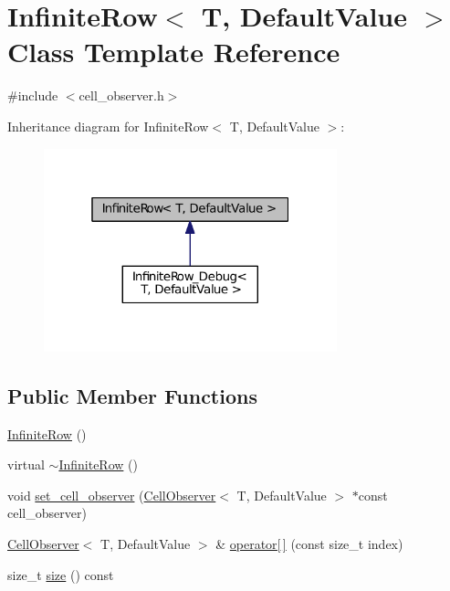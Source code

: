 \hypertarget{classInfiniteRow}{}\section{Infinite\+Row$<$ T, Default\+Value $>$ Class Template Reference}
\label{classInfiniteRow}


{\ttfamily \#include $<$cell\+\_\+observer.\+h$>$}



Inheritance diagram for Infinite\+Row$<$ T, Default\+Value $>$\+:
\nopagebreak
\begin{figure}[H]
\begin{center}
\leavevmode
\includegraphics[width=241pt]{classInfiniteRow__inherit__graph}
\end{center}
\end{figure}
\subsection*{Public Member Functions}
\begin{DoxyCompactItemize}
\item 
\hyperlink{classInfiniteRow_ab5d574f96b18c889ce001aa54c7fc56f}{Infinite\+Row} ()
\item 
virtual \hyperlink{classInfiniteRow_a35b43c388e4f3e980fbf823fbca37b36}{$\sim$\+Infinite\+Row} ()
\item 
void \hyperlink{classInfiniteRow_a5fd02e2dcf8710d54377ca29539f4c23}{set\+\_\+cell\+\_\+observer} (\hyperlink{classCellObserver}{Cell\+Observer}$<$ T, Default\+Value $>$ $\ast$const cell\+\_\+observer)
\item 
\hyperlink{classCellObserver}{Cell\+Observer}$<$ T, Default\+Value $>$ \& \hyperlink{classInfiniteRow_aa24edf2e7e8ea7c481fc32724cf24b6f}{operator\mbox{[}$\,$\mbox{]}} (const size\+\_\+t index)
\item 
size\+\_\+t \hyperlink{classInfiniteRow_a76e52c26ba4b10c0ff7852e6c449a51b}{size} () const 
\end{DoxyCompactItemize}


